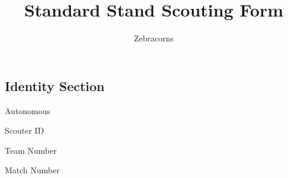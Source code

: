 \documentclass[english,pdf,pagemark,stamp]{sdaps}
\author{Zebracorns}
\title{Standard Stand Scouting Form}
\begin{document}
  \begin{questionnaire}[noinfo]

    \section{Identity Section}

\begin{multicols}{3}

\begin{multicols}{2}

  \begin{choicequestion}[1]{Autonomous}
  \end{choicequestion}
\vspace{27 mm}

\columnbreak

   \begin{choicegroup}{\hspace{1 mm}Scouter ID}
       \groupaddchoice{\Huge$\sqcup$}
       \groupaddchoice{\Huge$\sqcup$}
  
     \end{choicegroup}

\end{multicols}
 
\columnbreak
 
   \begin{choicegroup}{\hspace{14 mm}Team Number}
       \groupaddchoice{\Huge$\sqcup$}
       \groupaddchoice{\Huge$\sqcup$}
       \groupaddchoice{\Huge$\sqcup$}
       \groupaddchoice{\Huge$\sqcup$}
  
     \end{choicegroup}
 
\columnbreak
   \begin{choicegroup}{\hspace{22 mm}Match Number}
       \groupaddchoice{\Huge$\sqcup$}
       \groupaddchoice{\Huge$\sqcup$}
       \groupaddchoice{\Huge$\sqcup$}
  

\end{choicegroup}
\end{multicols}
\end{questionnaire}
\end{document}
